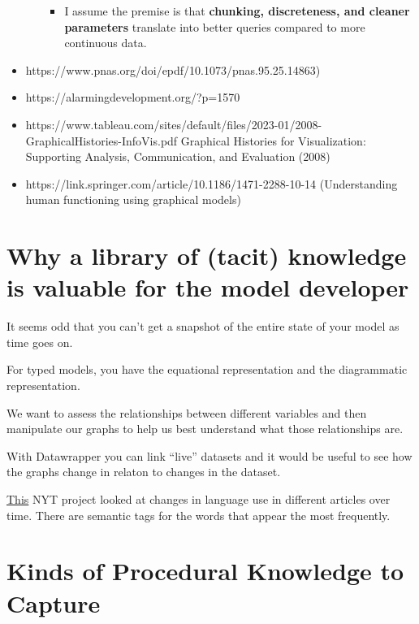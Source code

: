 \documentclass[
]{article}
\providecommand{\tightlist}{%
  \setlength{\itemsep}{0pt}\setlength{\parskip}{0pt}}\usepackage{longtable,booktabs,array}
\begin{document}
\begin{itemize}
\begin{itemize}
    \begin{itemize}
    \tightlist
    \item
      I assume the premise is that \textbf{chunking, discreteness, and
      cleaner parameters} translate into better queries compared to more
      continuous data.
    \end{itemize}
  \end{itemize}
\item
  https://www.pnas.org/doi/epdf/10.1073/pnas.95.25.14863)
\item
  https://alarmingdevelopment.org/?p=1570
\item
  https://www.tableau.com/sites/default/files/2023-01/2008-GraphicalHistories-InfoVis.pdf
  Graphical Histories for Visualization: Supporting Analysis,
  Communication, and Evaluation (2008)
\item
  https://link.springer.com/article/10.1186/1471-2288-10-14
  (Understanding human functioning using graphical models)
\end{itemize}

\section{Why a library of (tacit) knowledge is valuable for the model
developer}\label{why-a-library-of-tacit-knowledge-is-valuable-for-the-model-developer}

It seems odd that you can't get a snapshot of the entire state of your
model as time goes on.

For typed models, you have the equational representation and the
diagrammatic representation.

We want to assess the relationships between different variables and then
manipulate our graphs to help us best understand what those
relationships are.

With Datawrapper you can link ``live'' datasets and it would be useful
to see how the graphs change in relaton to changes in the dataset.

\href{https://nytlabs.com/projects/chronicle.html}{This} NYT project
looked at changes in language use in different articles over time. There
are semantic tags for the words that appear the most frequently.

\section{Kinds of Procedural Knowledge to
Capture}\label{kinds-of-procedural-knowledge-to-capture}
\end{document}
